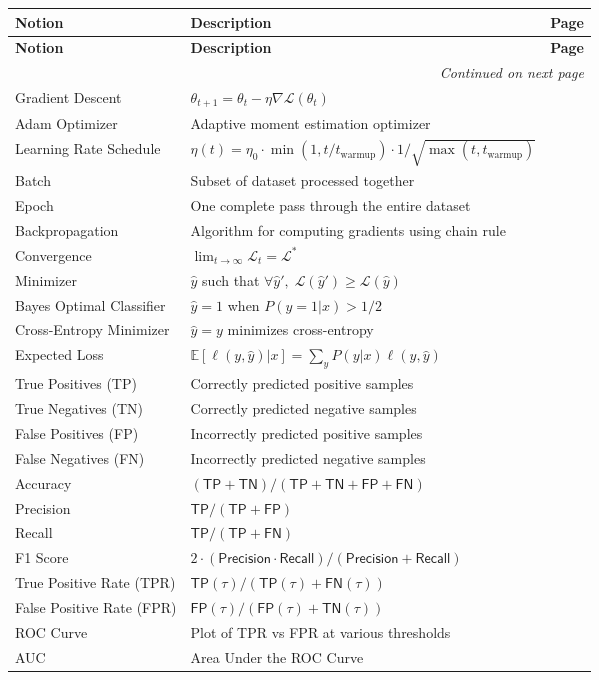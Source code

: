 \documentclass{amsart}
\newenvironment{notiontable}{%
	\renewcommand{\arraystretch}{1.2}%
	\setlength{\tabcolsep}{4pt}%
	\begin{longtable}{|l|p{10cm}|c|}
		\hline
		\textbf{Notion} & \textbf{Description} & \textbf{Page} \\
		\hline
		\endfirsthead
		\hline
		\textbf{Notion} & \textbf{Description} & \textbf{Page} \\
		\hline
		\endhead
		\hline
		\multicolumn{3}{r}{\textit{Continued on next page}} \\
		\endfoot
		\hline
		\endlastfoot
}{%
	\end{longtable}%
}
\theoremstyle{break}
\newcommand{\Forall}{\forall}
\begin{document}
\begin{notiontable}
		Gradient Descent & $\theta_{t+1} = \theta_t - \eta \nabla \mathcal{L}(\theta_t)$ & \pageref{def:backpropagation} \\
		Adam Optimizer & Adaptive moment estimation optimizer & \pageref{def:adam-optimizer} \\
		Learning Rate Schedule & $\eta(t) = \eta_0 \cdot \min(1, t/t_{\text{warmup}}) \cdot 1/\sqrt{\max(t, t_{\text{warmup}})}$ & \pageref{def:learning-rate-schedule} \\
		Batch & Subset of dataset processed together & \pageref{def:batch} \\
		Epoch & One complete pass through the entire dataset & \pageref{def:epoch} \\
		Backpropagation & Algorithm for computing gradients using chain rule & \pageref{def:backpropagation} \\
		Convergence & $\lim_{t \to \infty} \mathcal{L}_t = \mathcal{L}^*$ & \pageref{def:convergence} \\
		Minimizer & $\hat{y}$ such that $\Forall \hat{y}',\; \mathcal{L}(\hat{y}') \ge \mathcal{L}(\hat{y})$ & \pageref{def:minimizer} \\
		Bayes Optimal Classifier & $\hat{y}=1$ when $P(y=1|x) > 1/2$ & \pageref{def:bayes-optimal} \\
		Cross-Entropy Minimizer & $\hat{y} = y$ minimizes cross-entropy & \pageref{def:ce-minimizer} \\
		Expected Loss & $\mathbb{E}[\ell(y, \hat{y}) | x] = \sum_y P(y|x) \ell(y, \hat{y})$ & \pageref{def:exp-loss} \\
		
		True Positives (TP) & Correctly predicted positive samples & \pageref{def:tp} \\
		True Negatives (TN) & Correctly predicted negative samples & \pageref{def:tn} \\
		False Positives (FP) & Incorrectly predicted positive samples & \pageref{def:fp} \\
		False Negatives (FN) & Incorrectly predicted negative samples & \pageref{def:fn} \\
		Accuracy & $(\mathsf{TP} + \mathsf{TN}) / (\mathsf{TP} + \mathsf{TN} + \mathsf{FP} + \mathsf{FN})$ & \pageref{def:accuracy} \\
		Precision & $\mathsf{TP} / (\mathsf{TP} + \mathsf{FP})$ & \pageref{def:precision} \\
		Recall & $\mathsf{TP} / (\mathsf{TP} + \mathsf{FN})$ & \pageref{def:recall} \\
		F1 Score & $2 \cdot (\mathsf{Precision} \cdot \mathsf{Recall}) / (\mathsf{Precision} + \mathsf{Recall})$ & \pageref{def:f1-score} \\
		True Positive Rate (TPR) & $\mathsf{TP}(\tau) / (\mathsf{TP}(\tau) + \mathsf{FN}(\tau))$ & \pageref{def:tpr} \\
		False Positive Rate (FPR) & $\mathsf{FP}(\tau) / (\mathsf{FP}(\tau) + \mathsf{TN}(\tau))$ & \pageref{def:fpr} \\
		ROC Curve & Plot of TPR vs FPR at various thresholds & \pageref{def:roc} \\
		AUC & Area Under the ROC Curve & \pageref{def:auc} \\
		

\end{notiontable}
\end{document}
